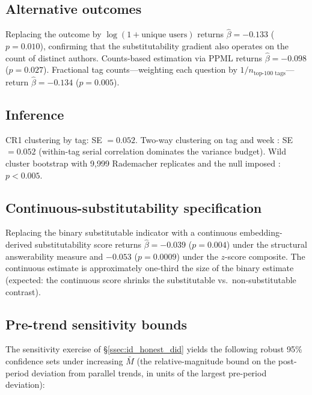 \subsection{Alternative outcomes}\label{app:rob_outcomes}

Replacing the outcome by $\log(1+\text{unique users})$
returns $\hat\beta=-0.133$ ($p=0.010$), confirming that the
substitutability gradient also operates on the count of
distinct authors. Counts-based estimation via PPML
\citep{santossilva2006log} returns $\hat\beta=-0.098$
($p=0.027$). Fractional tag counts---weighting each
question by $1/n_{\text{top-100 tags}}$---return
$\hat\beta=-0.134$ ($p=0.005$).

\subsection{Inference}\label{app:rob_inference}

CR1 clustering by tag: SE $=0.052$. Two-way clustering
on tag and week \citep{cameron2011robust}: SE $=0.052$
(within-tag serial correlation dominates the variance
budget). Wild cluster bootstrap with 9{,}999 Rademacher
replicates and the null imposed \citep{cameron2008wild}:
$p < 0.005$.

\subsection{Continuous-substitutability
specification}\label{app:rob_continuous}

Replacing the binary substitutable indicator with a
continuous embedding-derived substitutability score
returns
$\hat\beta = -0.039$ ($p=0.004$) under the structural
answerability measure and $-0.053$ ($p=0.0009$) under the
$z$-score composite. The continuous estimate is
approximately one-third the size of the binary estimate
(expected: the continuous score shrinks the substitutable
vs.\ non-substitutable contrast).

\subsection{Pre-trend sensitivity
bounds}\label{app:rob_honest}

The sensitivity exercise of \S\ref{ssec:id_honest_did}
yields the following robust 95\% confidence sets under
increasing $\bar M$ (the relative-magnitude bound on the
post-period deviation from parallel trends, in units of
the largest pre-period deviation):

